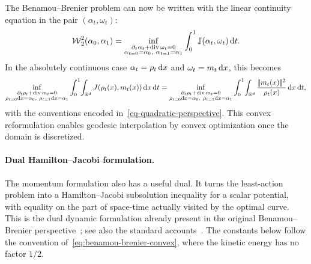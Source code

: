 The Benamou--Brenier problem can now be written with the linear continuity equation in the pair \((\alpha_t,\omega_t)\):
\begin{equation}\label{eq:benamou-brenier-convex}
	\operatorname{\mathcal{W}}_2^2(\alpha_0,\alpha_1)
	=
	\inf_{\substack{\partial_t\alpha_t+\operatorname{div} \omega_t=0\\
	\alpha_{t=0}=\alpha_0,\ \alpha_{t=1}=\alpha_1}}
	\int_0^1 \mathbb J(\alpha_t,\omega_t)\,\mathrm{d} t.
\end{equation}
In the absolutely continuous case \(\alpha_t=\rho_t\,\mathrm{d} x\) and \(\omega_t=m_t\,\mathrm{d} x\), this becomes
\[
	\inf_{\substack{\partial_t\rho_t+\operatorname{div} m_t=0\\
	\rho_{t=0}\mathrm{d} x=\alpha_0,\ \rho_{t=1}\mathrm{d} x=\alpha_1}}
	\int_0^1\!\int_{\mathbb{R}^d}
	J(\rho_t(x),m_t(x))\,\mathrm{d} x\,\mathrm{d} t
	=
	\inf_{\substack{\partial_t\rho_t+\operatorname{div} m_t=0\\
	\rho_{t=0}\mathrm{d} x=\alpha_0,\ \rho_{t=1}\mathrm{d} x=\alpha_1}}
	\int_0^1\!\int_{\mathbb{R}^d}
	\frac{|\!| m_t(x) |\!|^2}{\rho_t(x)}\,\mathrm{d} x\,\mathrm{d} t,
\]
with the conventions encoded in~\eqref{eq-quadratic-perspective}. This convex reformulation enables geodesic interpolation by convex optimization once the domain is discretized.

\paragraph{Dual Hamilton--Jacobi formulation.}

The momentum formulation also has a useful dual. It turns the least-action problem into a Hamilton--Jacobi subsolution inequality for a scalar potential, with equality on the part of space-time actually visited by the optimal curve. This is the dual dynamic formulation already present in the original Benamou--Brenier perspective~\citep{benamou2000computational}; see also the standard accounts~\citep{Villani03,SantambrogioBook}. The constants below follow the convention of~\eqref{eq:benamou-brenier-convex}, where the kinetic energy has no factor $1/2$.

